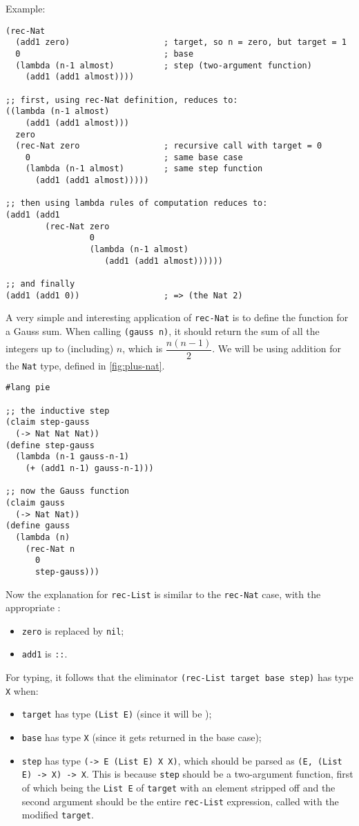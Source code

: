 Example:
{
  \small
\begin{verbatim}
(rec-Nat 
  (add1 zero)                   ; target, so n = zero, but target = 1
  0                             ; base
  (lambda (n-1 almost)          ; step (two-argument function)
    (add1 (add1 almost))))

;; first, using rec-Nat definition, reduces to:
((lambda (n-1 almost)
    (add1 (add1 almost)))
  zero
  (rec-Nat zero                 ; recursive call with target = 0
    0                           ; same base case
    (lambda (n-1 almost)        ; same step function
      (add1 (add1 almost)))))

;; then using lambda rules of computation reduces to:
(add1 (add1
        (rec-Nat zero
                 0
                 (lambda (n-1 almost)
                    (add1 (add1 almost))))))

;; and finally
(add1 (add1 0))                 ; => (the Nat 2)
\end{verbatim}
}

A very simple and interesting application of \texttt{rec-Nat} is to define
the function for a Gauss sum. When calling \texttt{(gauss n)}, it should
return the sum of all the integers up to (including) $ n $, which is
$ \dfrac{n(n-1)}{2} $. We will be using addition for the \texttt{Nat}
type, defined in \ref{fig:plus-nat}.
{
  \small
\begin{verbatim}
#lang pie

;; the inductive step
(claim step-gauss
  (-> Nat Nat Nat))
(define step-gauss
  (lambda (n-1 gauss-n-1)
    (+ (add1 n-1) gauss-n-1)))

;; now the Gauss function
(claim gauss
  (-> Nat Nat))
(define gauss
  (lambda (n)
    (rec-Nat n
      0
      step-gauss)))
\end{verbatim}
}

\vspace{0.3cm}
Now the explanation for \texttt{rec-List} is similar to the \texttt{rec-Nat} case,
with the appropriate :
\begin{itemize}
\item \texttt{zero} is replaced by \texttt{nil};
\item \texttt{add1} is \texttt{::}.
\end{itemize}

For typing, it follows that the eliminator \texttt{(rec-List target base step)}
has type \texttt{X} when:
\begin{itemize}
\item \texttt{target} has type \texttt{(List E)} (since it will be );
\item \texttt{base} has type \texttt{X} (since it gets returned in the base case);
\item \texttt{step} has type \texttt{(-> E (List E) X X)}, which should be
  parsed as \texttt{(E, (List E) -> X) -> X}. This is because \texttt{step} should
  be a two-argument function, first of which being the \texttt{List E} of \texttt{target}
  with an element stripped off and the second argument should be the entire
  \texttt{rec-List} expression, called with the modified \texttt{target}.
\end{itemize}

